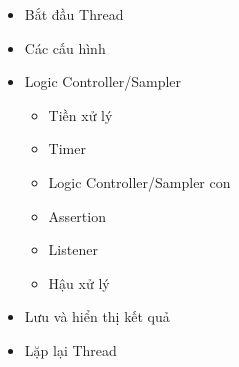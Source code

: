 \documentclass[12pt]{report}
\begin{document}
\begin{itemize}
    \item Bắt đầu Thread
    \item Các cấu hình
    \item Logic Controller/Sampler
          \begin{itemize}
              \item Tiền xử lý
              \item Timer
              \item Logic Controller/Sampler con
              \item Assertion
              \item Listener
              \item Hậu xử lý
          \end{itemize}
    \item Lưu và hiển thị kết quả
    \item Lặp lại Thread
\end{itemize}
\end{document}
